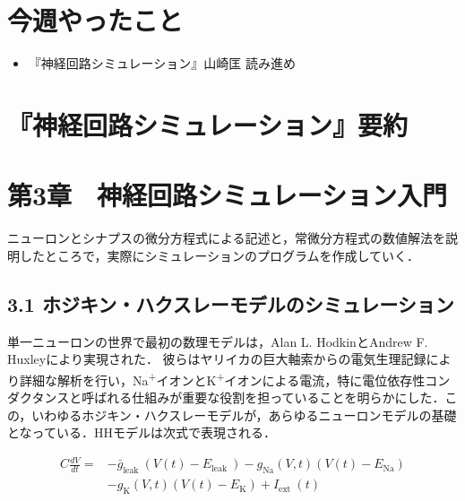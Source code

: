 \documentclass[dvipdfmx, A4j, twocolumn, 10.5pt]{jsarticle}
\begin{document}


\section{今週やったこと}
\begin{itemize}
 \item 『神経回路シミュレーション』山崎匡 読み進め

\end{itemize}
\section{『神経回路シミュレーション』要約}


\section*{第3章　神経回路シミュレーション入門}

ニューロンとシナプスの微分方程式による記述と，常微分方程式の数値解法を説明したところで，実際にシミュレーションのプログラムを作成していく．

\subsection*{3.1 ホジキン・ハクスレーモデルのシミュレーション}
単一ニューロンの世界で最初の数理モデルは，Alan L. HodkinとAndrew F. Huxleyにより実現された．
彼らはヤリイカの巨大軸索からの電気生理記録により詳細な解析を行い，Na\textsuperscript{+}イオンとK\textsuperscript{+}イオンによる電流，特に電位依存性コンダクタンスと呼ばれる仕組みが重要な役割を担っていることを明らかにした．この，いわゆるホジキン・ハクスレーモデルが，あらゆるニューロンモデルの基礎となっている．HHモデルは次式で表現される．



$$
\begin{aligned}
C \frac{d V}{d t}= & -\bar{g}_{\text {leak }}\left(V(t)-E_{\text {leak }}\right)-g_{\mathrm{Na}}(V, t)\left(V(t)-E_{\mathrm{Na}}\right) \\
&  -g_{\mathrm{K}}(V, t)\left(V(t)-E_{\mathrm{K}}\right) +I_{\text {ext }}(t)
\end{aligned}
$$
\end{document}
